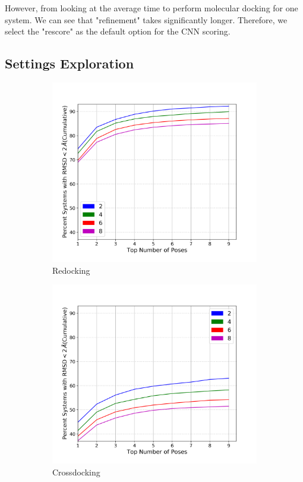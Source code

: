 \documentclass[journal=jcisd8,manuscript=article]{achemso}
\begin{document}
However, from looking at the average time to perform molecular docking for one system. We can see that "refinement" takes significantly longer. Therefore, we select the "rescore" as the default option for the CNN scoring.

\subsection{Settings Exploration}
\begin{figure}    
        \begin{subfigure}[b]{0.48\textwidth}    
		\centering
		\includegraphics[width=\textwidth]{figures/redocking/sweep_autobox_add_line.png}
		\caption{Redocking}
		\label{fig:autobox add rd}
        \end{subfigure}    
        \begin{subfigure}[b]{0.48\textwidth}    
		\centering
		\includegraphics[width=\textwidth]{figures/crossdocking/sweep_autobox_add_line.png}
		\caption{Crossdocking}
		\label{fig:autobox add cd}
        \end{subfigure}    
	\caption{}
	\label{fig:autobox add}
\end{figure}    
\end{document}
